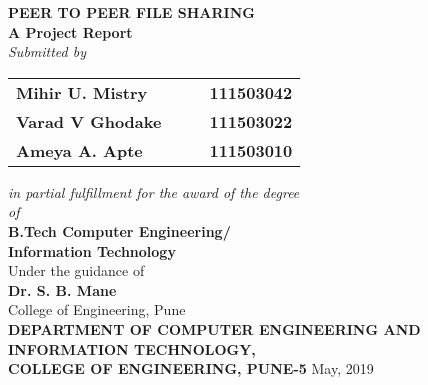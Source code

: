 \begin{titlepage}
\begin{center}
\LARGE{\bf{PEER TO PEER FILE SHARING\\}}	%
\Large{\bf{A Project Report\\}}		%
\Large{\em{Submitted by\\}}
\begin{table}[htbp]
	\begin{center}
	\begin{tabular}{ l c c l }
	\Large\bf{Mihir U. Mistry} & & & \Large\bf{111503042} \\[0.3cm]
	\Large\bf{Varad V Ghodake} & & & \Large\bf{111503022} \\[0.3cm]
	\Large\bf{Ameya A. Apte} & & & \Large\bf{111503010} \\
	\end{tabular}
	\end{center}
	\end{table}
\Large{\em{in partial fulfillment for the award of the degree\\ \vspace{1.5pt}of\\}}
\LARGE{\bf{B.Tech Computer Engineering/\\Information Technology\\}}%
\Large{Under the guidance of\\ }
\Large{\bf{Dr. S. B. Mane}\\}
\Large{College of Engineering, Pune\\}
\Large{\bf{DEPARTMENT OF COMPUTER ENGINEERING AND \\INFORMATION TECHNOLOGY,\\
COLLEGE OF ENGINEERING, PUNE-5}}
\vfill
\large{May, 2019}
\end{center}
\end{titlepage}
